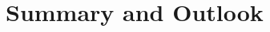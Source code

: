 \documentclass[journal=jacsat,manuscript=article]{achemso}
\begin{document}


\section*{Summary and Outlook}
\end{document}
